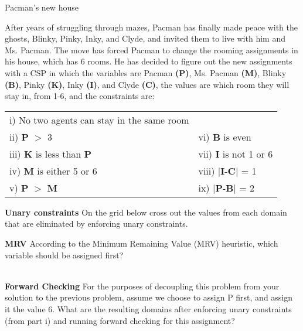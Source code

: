 \newcommand{\cross}[1]{{\color{blue}\sout{#1}}}
\begin{problem}{Pacman's new house}

After years of struggling through mazes, Pacman has finally made peace with the ghosts, Blinky, Pinky, Inky, and Clyde, and invited them to live with him and Ms. Pacman. The move has forced Pacman to change the rooming assignments in his house, which has 6 rooms. He has decided to figure out the new assignments with a CSP in which the variables are Pacman \textbf{(P)}, Ms. Pacman \textbf{(M)}, Blinky \textbf{(B)}, Pinky \textbf{(K)}, Inky \textbf{(I)}, and Clyde \textbf{(C)}, the values are which room they will stay in, from 1-6, and the constraints are:\\
\begin{table}[h]
\centering
\begin{tabular}{ll}
i) No two agents can stay in the same room&\\
ii) \textbf{P} $>$ 3 &
vi) \textbf{B} is even\\
iii) \textbf{K} is less than \textbf{P}&
vii) \textbf{I} is not 1 or 6\\
iv) \textbf{M} is either 5 or 6&
viii) $\vert$\textbf{I}-\textbf{C}$\vert$ = 1\\
v) \textbf{P} $>$ \textbf{M}&
ix) $\vert$\textbf{P}-\textbf{B}$\vert$ = 2
\end{tabular}
\end{table}

\begin{question}[10]{\bf Unary constraints}
On the grid below cross out the values from each domain that are eliminated by enforcing unary constraints.
\begin{center}
\AnswerTwoAi
\end{center}
\end{question}

\begin{question}[3]{\bf MRV}
According to the Minimum Remaining Value (MRV) heuristic, which variable should be assigned first?\\\\
\AnswerTwoAii
\end{question}

\begin{question}[10]{\bf Forward Checking}
For the purposes of decoupling this problem from your solution to the
previous problem, assume we choose to assign P first, and assign it the value 6. What are the resulting domains after enforcing unary constraints (from part i) and running forward checking for this assignment?
\begin{center}
\AnswerTwoAiii
\end{center}
\end{question}


\end{problem}
